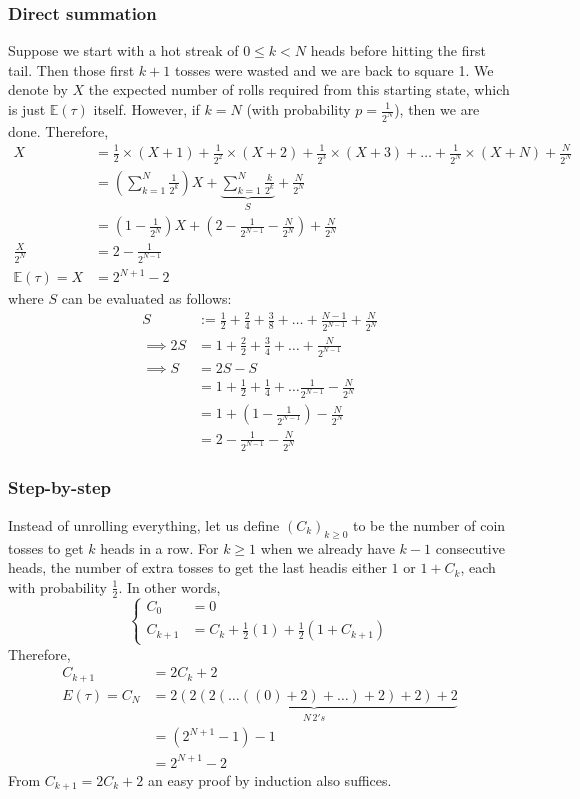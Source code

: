 \documentclass[11pt]{article}
\newcommand{\E}{\mathbb{E}}
\begin{document}
\subsubsection{Direct summation}
Suppose we start with a hot streak of $0 \leq k < N$ heads before hitting the first tail. Then those first $k+1$ tosses were wasted and we are back to square 1. We denote by $X$ the expected number of rolls required from this starting state, which is just $\E(\tau)$ itself. However, if $k=N$ (with probability $p=\frac{1}{2^N}$), then we are done. Therefore,
\begin{align*}
X &= \frac{1}{2} \times (X+1) + \frac{1}{2^2} \times (X+2) + \frac{1}{2^3} \times (X+3) + \dots + \frac{1}{2^N} \times (X+N) + \frac{N}{2^N}\\
&= \left(\sum_{k=1}^{N}\frac{1}{2^k}\right)X + \underbrace{\sum_{k=1}^{N}\frac{k}{2^k}}_{S} + \frac{N}{2^N} \\
&= (1-\frac{1}{2^N})X + \left(2 - \frac{1}{2^{N-1}} - \frac{N}{2^N}\right) + \frac{N}{2^N} \\
\frac{X}{2^N} &= 2 - \frac{1}{2^{N-1}} \\
\E(\tau) = X &= \boxed{2^{N+1} - 2}
\end{align*}
where $S$ can be evaluated as follows:
\begin{align*}
S&:= \frac{1}{2} + \frac{2}{4} + \frac{3}{8} + \dots + \frac{N-1}{2^{N-1}} + \frac{N}{2^N} \\
\implies 2S &= 1 + \frac{2}{2} + \frac{3}{4} + \dots + \frac{N}{2^{N-1}} \\
\implies S &= 2S - S \\
&=1 + \frac{1}{2} + \frac{1}{4} + \dots \frac{1}{2^{N-1}} - \frac{N}{2^N} \\
&=1 + (1-\frac{1}{2^{N-1}}) - \frac{N}{2^N} \\
&= 2 - \frac{1}{2^{N-1}} - \frac{N}{2^N}
\end{align*}

\subsubsection{Step-by-step}
Instead of unrolling everything, let us define $(C_k)_{k\geq 0}$ to be the number of coin tosses to get $k$ heads in a row. For $k \geq 1$ when we already have $k-1$ consecutive heads, the number of extra tosses to get the last headis either $1$ or $1 + C_k$, each with probability $\frac{1}{2}$. In other words, 
\begin{equation*}
\left\{ \begin{aligned} 
  C_0 &= 0 \\
  C_{k+1} &= C_k + \frac{1}{2}(1) + \frac{1}{2}(1+C_{k+1})
\end{aligned} \right.
\end{equation*}
Therefore,
\begin{align*}
C_{k+1} &= 2C_k + 2 \\
E(\tau) = C_N &= \underbrace{2(2(2(\dots ((0) + 2) + \dots )+ 2)+2)+2}_{N \, 2's} \\
&= (2^{N+1} - 1) - 1 \\
&= \boxed{2^{N+1} - 2}
\end{align*}
From $C_{k+1} = 2C_k+2$ an easy proof by induction also suffices.
\end{document}
